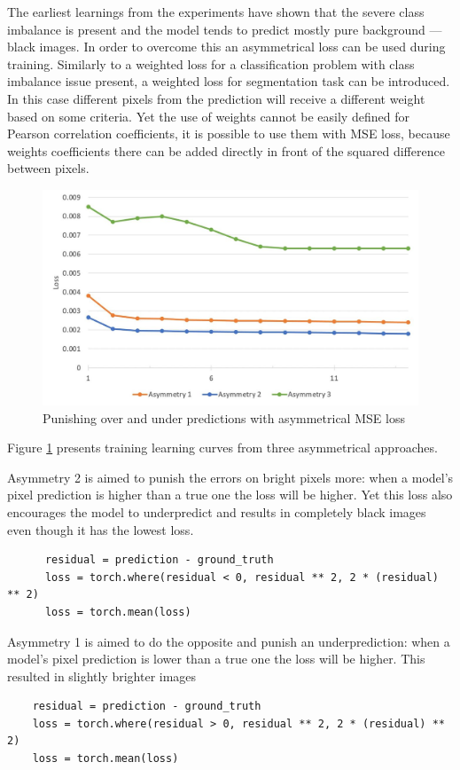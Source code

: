The earliest learnings from the experiments have shown that the severe class imbalance is present and the model tends to predict mostly pure background --- black images. In order to overcome this an asymmetrical loss can be used during training. Similarly to a weighted loss for a classification problem with class imbalance issue present, a weighted loss for segmentation task can be introduced. In this case different pixels from the prediction will receive a different weight based on some criteria. Yet the use of weights cannot be easily defined for Pearson correlation coefficients, it is possible to use them with MSE loss, because weights coefficients there can be added directly in front of the squared difference between pixels. 
\begin{figure}[H]
	\begin{center}
		\includegraphics[width=0.5\linewidth]{bilder/golgi/asymmetrical-training.jpg}
		\caption{Punishing over and under predictions with asymmetrical MSE loss}\label{fig:golgi-asymmetrical-training}
	\end{center}
\end{figure}

Figure \ref{fig:golgi-asymmetrical-training} presents training learning curves from three asymmetrical approaches.

Asymmetry 2 is aimed to punish the errors on bright pixels more: when a model's pixel prediction is higher than a true one the loss will be higher. Yet this loss also encourages the model to underpredict and results in completely black images even though it has the lowest loss.
  \begin{lstlisting}
	  residual = prediction - ground_truth
	  loss = torch.where(residual < 0, residual ** 2, 2 * (residual) ** 2)
	  loss = torch.mean(loss)
	\end{lstlisting}

Asymmetry 1 is aimed to do the opposite and punish an underprediction: when a model's pixel prediction is lower than a true one the loss will be higher. This resulted in slightly brighter images
\begin{lstlisting}
	residual = prediction - ground_truth
	loss = torch.where(residual > 0, residual ** 2, 2 * (residual) ** 2)
	loss = torch.mean(loss)
  \end{lstlisting}

